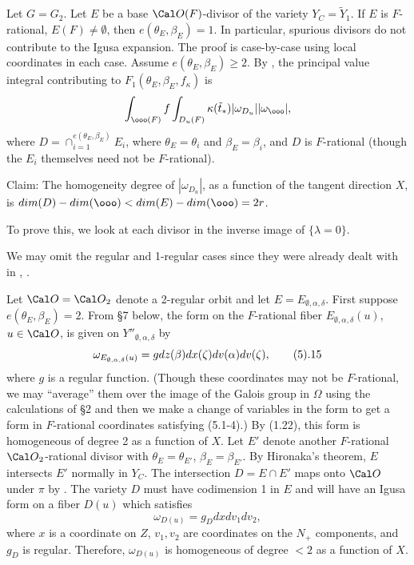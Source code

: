 Let $G=G_2$.
Let $E$ be a base ${\Cal O}(F)$-divisor of the 
variety $Y_C=\tilde{Y}_1$. If $E$ is $F$-rational, $E(F)\not= \emptyset$,
then $e(\theta_E,\beta_E)=1$. In particular, spurious divisors
do not contribute to the Igusa expansion.
\endproclaim
{} The proof is case-by-case using local coordinates in each case.
Assume $e(\theta_E,\beta_E)\geq 2$. By \cite{L}, the
principal value integral contributing to 
$F_1(\theta_E,\beta_E,f_\kappa)$ is
$$
\int_{\ooo(F)}f\int_{D_u(F)}\kappa(\tilde{t}_*)
|\omega_{D_u}||\omega_{\ooo}|,
$$
where $D=\cap_{i=1}^{e(\theta_E,\beta_E)}E_i$, 
where $\theta_E=\theta_i$ and $\beta_E=\beta_i$,
and $D$ is $F$-rational (though the $E_i$ themselves need not be
$F$-rational). 

Claim: The homogeneity degree of $|\omega_{D_u}|$, as a function
of the tangent direction $X$, is $dim(D)-dim(\ooo)<dim(E)-dim(\ooo)=2r$.

To prove this, we look at each divisor in the inverse image of
$\{\lambda =0\}$. 

We may omit the regular and 1-regular cases since they were already
dealt with in \cite{H1}, \cite{LS2}.

Let ${\Cal O}={\Cal O}_2$ denote a 2-regular orbit and let 
$E=E_{\emptyset, \alpha,\delta}$. 
First suppose $e(\theta_E,\beta_E)=2$.
From \S 7 below, the form on the $F$-rational fiber
$E_{\emptyset,\alpha,\delta}(u)$, $u\in {\Cal O}$, is given 
on $Y''_{\emptyset,\alpha,\delta}$ by
$$
\omega_{E_{\emptyset,\alpha,\delta}(u)}
=gdz(\beta)dx(\zeta)dv(\alpha)dv(\zeta),
\tag 5.15
$$
where $g$ is a regular function.
(Though these coordinates may not be $F$-rational, we
may ``average'' them over the image of the Galois group in $\Omega$
using the calculations of \S 2 and then we make a change
of variables in the form to get a form in $F$-rational coordinates
satisfying (5.1-4).)
By (1.22), this form is homogeneous
of degree 2 as a function of $X$. Let $E'$ denote another 
$F$-rational ${\Cal O}_2$-rational divisor with
$\theta_E=\theta_{E'}$, $\beta_E =\beta_{E'}$. By Hironaka's theorem,
$E$ intersects $E'$ normally in $Y_C$. The intersection $D=E\cap E'$
maps onto ${\Cal O}$ under $\pi$ by \cite{DG, chap II, Prop 3.1}. 
The variety $D$ must have codimension 1 in $E$ and will have
an Igusa form on 
a fiber $D(u)$ which satisfies
$$
\omega_{D(u)}=g_Ddx dv_1dv_2,
$$
where $x$ is a coordinate on $Z$, $v_1,v_2$ are coordinates on the
$N_+$ components, and $g_D$ is regular. Therefore, $\omega_{D(u)}$
is homogeneous of degree $<2$ as a function of $X$. 

